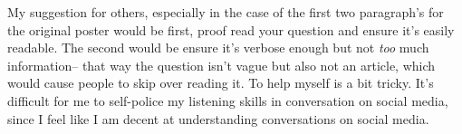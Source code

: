 \documentclass[12pt]{article}
\begin{document}
\par
My suggestion for others, especially in the case of the first two paragraph's for the original poster would be first, proof read your question and ensure it's easily readable. The second would be ensure it's verbose enough but not \emph{too} much information-- that way the question isn't vague but also not an article, which would cause people to skip over reading it. To help myself is a bit tricky. It's difficult for me to self-police my listening skills in conversation on social media, since I feel like I am decent at understanding conversations on social media.
\end{document}
